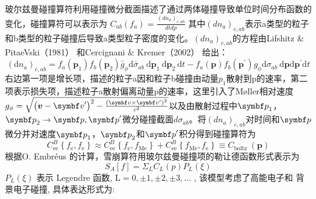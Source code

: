 玻尔兹曼碰撞算符利用碰撞微分截面描述了通过两体碰撞导致单位时间分布函数的变化，碰撞算符可以表示为
$C_{a b}\left(f_{a}\right)=\frac{\left(d n_{a}\right)_{c, a b}}{d t d p}$
其中$(𝑑𝑛_𝑎)_{𝑐,ab}$表示a类型的粒子和b类型的粒子碰撞后导致a类型粒子密度的变化。$(𝑑𝑛_𝑎)_{𝑐,ab}$的方程由Lifshitz \& PitaeVski（1981）\cite{RN1938}	和Cercignani \& Kremer（2002）\cite{RN1940} 给出：
\begin{equation}
\left(\mathrm{d} n_{a}\right)_{c, a b}=f_{a}\left(\boldsymbol{p}_{1}\right) f_{b}\left(\boldsymbol{p}_{2}\right) \bar{g}_{\phi} \mathrm{d} \bar{\sigma}_{a b} \mathrm{~d} \boldsymbol{p}_{1} \mathrm{~d} \boldsymbol{p}_{2} \mathrm{~d} t-f_{a}(\boldsymbol{p}) f_{b}\left(\boldsymbol{p}^{\prime}\right) g_{\phi} \mathrm{d} \sigma_{a b} \mathrm{~d} \boldsymbol{p} \mathrm{d} \boldsymbol{p}^{\prime} \mathrm{d} t
\end{equation}
右边第一项是增长项，描述的粒子a因和粒子b碰撞由动量$p_1$散射到p的速率，第二项表示损失项，描述粒子a散射偏离动量p的速率，这里引入了Møller相对速度\cite{RN2058}$g_{\phi}=\sqrt{\left(\boldsymbol{v}-\vv^{\prime}\right)^{2}-\frac{\left(\vv \times \vv^{\prime}\right)^{2}}{c^{2}}}$以及由散射过程中$\vp_1$，$\vp_2\to \vp,\vp'$微分碰撞截面$dσ_{ab}$。将$(dn_a)_{c,ab}$对时间和$\vp$微分并对速度$\vp_1$，$\vp_2$和$\vp'$积分得到碰撞算符为
\begin{equation}
C_{\mathrm{ee}}^{B}\left\{f_{\mathrm{e}}, f_{\mathrm{e}}\right\} \approx C_{\mathrm{ee}}^{B}\left\{f_{\mathrm{e}}, f_{\mathrm{Me}}\right\}+C_{\mathrm{ee}}^{B}\left\{f_{\mathrm{Me}}, f_{\mathrm{e}}\right\} \equiv C_{\text {boltz }}(\boldsymbol{p})
\end{equation}
根据O. Embréus\cite{RN1811}	的计算，雪崩算符用玻尔兹曼碰撞项的勒让德函数形式表示为
\begin{equation}
S_{A}[f]=\Sigma_{L} C_{L}(p) P_{L}(\xi)
\end{equation}
 $P_{L}(\xi) $ 表示 Legendre 函数, $ \mathrm{L}=0, \pm 1 , \pm 2 , \pm 3, \ldots$ , 该模型考虑了高能电子和 背景电子碰撞, 具体表达形式为:
